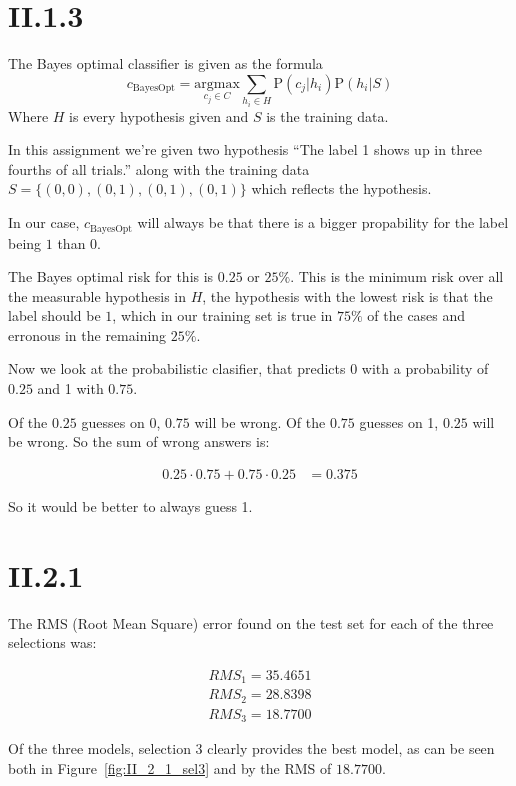 \section*{II.1.3}

The Bayes optimal classifier is given as the formula
\[
   c_{\text{BayesOpt}} = \underset{c_j \in C}{\text{argmax}} \sum_{h_i \in H}\text{P}(c_j|h_i)\text{P}(h_i|S)
\]
Where $H$ is every hypothesis given and $S$ is the training data.

In this assignment we're given two hypothesis ``The label 1 shows up in three fourths of all trials.''
along with the training data $S = \{(0,0), (0,1), (0,1), (0,1)\}$ which reflects the hypothesis.

In our case, $c_{\text{BayesOpt}}$ will always be that there is a bigger propability for the label being $1$ than $0$.

The Bayes optimal risk for this is $0.25$ or $25\%$. This is the minimum risk over all the measurable hypothesis in $H$, the hypothesis with the lowest risk is that the label should be $1$, which in our training set is true in $75\%$ of the cases and erronous in the remaining $25\%$.

Now we look at the probabilistic clasifier, that predicts 0 with a probability of $0.25$ and 1 with $0.75$.

Of the $0.25$ guesses on 0, $0.75$ will be wrong. Of the $0.75$ guesses on 1, $0.25$ will be wrong. So the sum of wrong answers is:

\begin{align*}
  0.25\cdot0.75 + 0.75\cdot0.25 &= 0.375
\end{align*}

So it would be better to always guess 1.

\pagebreak
\section*{II.2.1}
The RMS (Root Mean Square) error found on the test
set for each of the three selections was:

\begin{align*}
	RMS_1 = 35.4651 \\
	RMS_2 = 28.8398 \\
	RMS_3 = 18.7700
\end{align*}

Of the three models, selection 3 clearly provides
the best model, as can be seen both in Figure~\ref{fig:II_2_1_sel3} and by the RMS of
$18.7700$.

